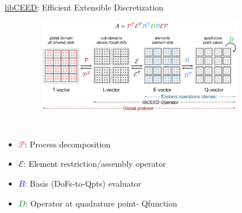 \documentclass[aspectratio=169,xcolor=dvipsnames]{beamer}
\begin{document}
\begin{frame}{\href{https://libceed.readthedocs.io}{libCEED}: Efficient Extensible Discretization}
\begin{figure}[t]
    \includegraphics[width=4in,height=1.6in]{figures/libCEEDAPI.png} %
\end{figure}

\begin{columns}[c] %

    {\footnotesize
    \begin{itemize}
    \item \textcolor{red}{$\mathcal{P}$}: Process decomposition
    \item \textcolor{black}{$\mathcal{E}$}: Element restriction/assembly operator
    \item \textcolor{blue}{${B}$}: Basis (DoFs-to-Qpts) evaluator
    \item  \textcolor{green}{${D}$}: Operator at quadrature point- Qfunction
    \end{itemize}
    }

    \end{columns}

\end{frame}

\end{document}
